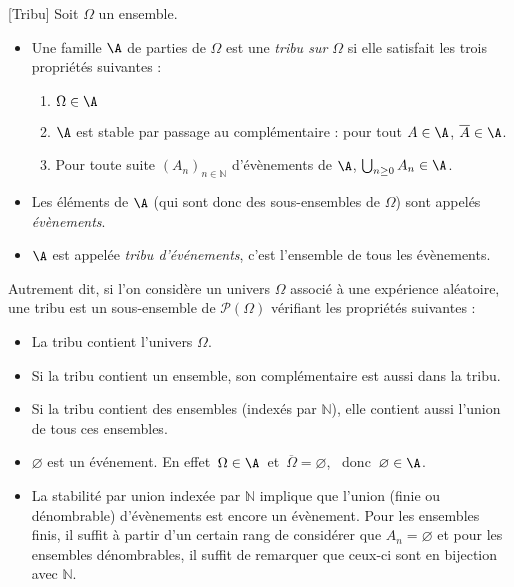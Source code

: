 \documentclass[a4paper,10pt]{report}
\begin{document}
\begin{itemize}
\begin{Definition}{}[Tribu]
Soit $\Omega $ un ensemble. 
\begin{itemize}
\item Une famille $\A$ de parties de $\Omega$ est une \emph{tribu sur $\Omega$} si elle satisfait les trois propriétés suivantes :
\begin{enumerate}
\item $\Omega \in\A$ 
\item $\A$ est stable par passage au complémentaire : pour tout $A \in\A$,  $\overline{A} \in \A$.
\item Pour toute suite $(A_n)_{n \in \mathbb{N}}$ d'évènements de $\A$, $\bigcup_{n \geq 0} A_n \in \A$.
\end{enumerate}
\item Les éléments de $\A$ (qui sont donc des sous-ensembles de $\Omega$) sont appelés \emph{évènements}.
\item $\A$ est appelée \emph{tribu d'événements}, c'est l'ensemble de tous les évènements.
\end{itemize}
\end{Definition}

\vspace{0.2cm}

Autrement dit, si l'on considère un univers $\Omega$ associé à une expérience aléatoire, une tribu est un sous-ensemble de $\mathcal{P}(\Omega)$ vérifiant les propriétés suivantes :
\begin{itemize}
\item La tribu contient l'univers $\Omega$.
\item Si la tribu contient un ensemble, son complémentaire est aussi dans la tribu.
\item Si la tribu contient des ensembles (indexés par $\mathbb{N}$), elle contient aussi l'union de tous ces ensembles.
\end{itemize}

\vspace{0.2cm}

\begin{Remarques}{}
\begin{itemize}
\item $\varnothing$ est un événement. En effet $\,\Omega \in\A\,$ et $\,\overline{\Omega} = \varnothing$, \ donc $\,\varnothing\in\A$.
\item La stabilité par union indexée par $\mathbb{N}$ implique que l'union (finie ou dénombrable) d'évènements est encore un évènement. Pour les ensembles finis, il suffit à partir d'un certain rang de considérer que $A_n = \varnothing$ et pour les ensembles dénombrables, il suffit de remarquer que ceux-ci sont en bijection avec $\mathbb{N}$.
\end{itemize}
\end{Remarques}{}


\end{itemize}
\end{document}
